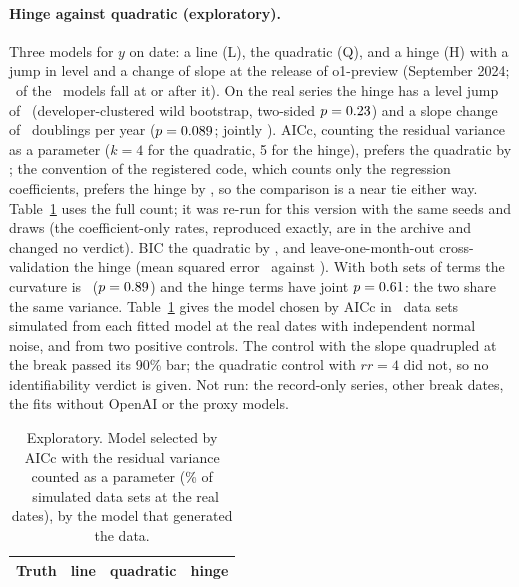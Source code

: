 \documentclass[aps,pre,twocolumn,superscriptaddress,nofootinbib,9pt]{revtex4-2}
\newcommand{\rr}{rr}
\begin{document}
\paragraph*{Hinge against quadratic (exploratory).} Three models for $y$ on date: a line (L), the quadratic (Q), and a hinge (H) with a jump in level and a change of slope at the release of o1-preview (September 2024; \hgPost\ of the \nModels\ models fall at or after it). On the real series the hinge has a level jump of \hgD\ (developer-clustered wild bootstrap, two-sided $p=0.23$) and a slope change of \hgG\ doublings per year ($p=0.089$; jointly \hgJointP). AICc, counting the residual variance as a parameter ($k=4$ for the quadratic, 5 for the hinge), prefers the quadratic by \hgAiccDiffV; the convention of the registered code, which counts only the regression coefficients, prefers the hinge by \hgAiccDiff, so the comparison is a near tie either way. Table~\ref{tab:hinge} uses the full count; it was re-run for this version with the same seeds and draws (the coefficient-only rates, reproduced exactly, are in the archive and changed no verdict). BIC the quadratic by \hgBicDiff, and leave-one-month-out cross-validation the hinge (mean squared error \hgCvH\ against \hgCvQ). With both sets of terms the curvature is \hgCQH\ ($p=0.89$) and the hinge terms have joint $p=0.61$: the two share the same variance. Table~\ref{tab:hinge} gives the model chosen by AICc in \hgR\ data sets simulated from each fitted model at the real dates with independent normal noise, and from two positive controls. The control with the slope quadrupled at the break passed its 90\% bar; the quadratic control with $\rr=4$ did not, so no identifiability verdict is given. Not run: the record-only series, other break dates, the fits without OpenAI or the proxy models.

\begin{table}[H]
\caption{Exploratory. Model selected by AICc with the residual variance counted as a parameter (\% of \hgR\ simulated data sets at the real dates), by the model that generated the data.}
\label{tab:hinge}
\footnotesize
\begin{ruledtabular}
\begin{tabular}{lccc}
Truth & line & quadratic & hinge \\
\hline

\end{tabular}
\end{ruledtabular}
\end{table}
\end{document}
